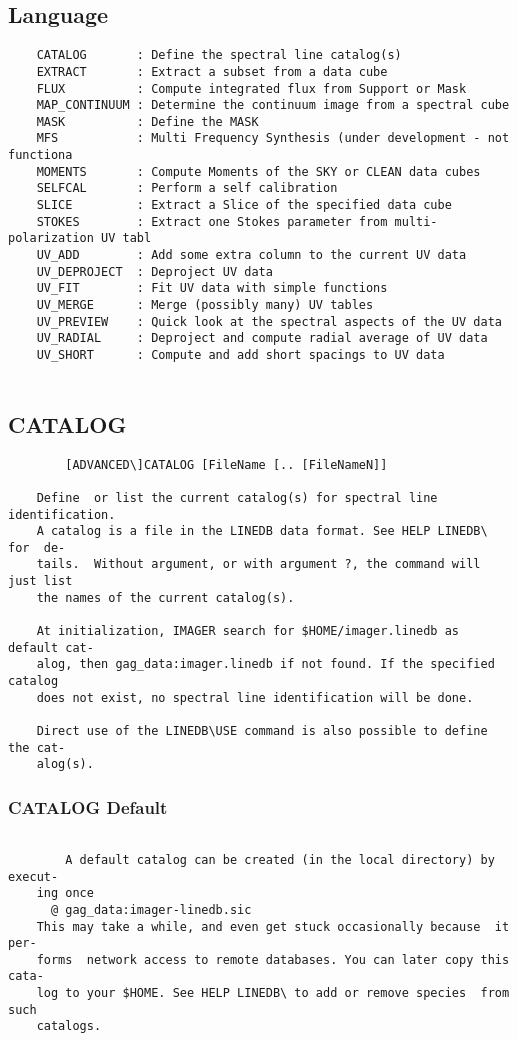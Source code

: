 \subsection{Language}
\begin{verbatim}
    CATALOG       : Define the spectral line catalog(s)
    EXTRACT       : Extract a subset from a data cube
    FLUX          : Compute integrated flux from Support or Mask
    MAP_CONTINUUM : Determine the continuum image from a spectral cube
    MASK          : Define the MASK
    MFS           : Multi Frequency Synthesis (under development - not functiona
    MOMENTS       : Compute Moments of the SKY or CLEAN data cubes
    SELFCAL       : Perform a self calibration
    SLICE         : Extract a Slice of the specified data cube
    STOKES        : Extract one Stokes parameter from multi-polarization UV tabl
    UV_ADD        : Add some extra column to the current UV data
    UV_DEPROJECT  : Deproject UV data
    UV_FIT        : Fit UV data with simple functions
    UV_MERGE      : Merge (possibly many) UV tables
    UV_PREVIEW    : Quick look at the spectral aspects of the UV data
    UV_RADIAL     : Deproject and compute radial average of UV data
    UV_SHORT      : Compute and add short spacings to UV data


\end{verbatim}
\subsection{CATALOG}
\begin{verbatim}
        [ADVANCED\]CATALOG [FileName [.. [FileNameN]]

    Define  or list the current catalog(s) for spectral line identification.
    A catalog is a file in the LINEDB data format. See HELP LINEDB\ for  de-
    tails.  Without argument, or with argument ?, the command will just list
    the names of the current catalog(s).

    At initialization, IMAGER search for $HOME/imager.linedb as default cat-
    alog, then gag_data:imager.linedb if not found. If the specified catalog
    does not exist, no spectral line identification will be done.

    Direct use of the LINEDB\USE command is also possible to define the cat-
    alog(s).

\end{verbatim}
\subsubsection{CATALOG Default}
\begin{verbatim}

        A default catalog can be created (in the local directory) by execut-
    ing once
      @ gag_data:imager-linedb.sic
    This may take a while, and even get stuck occasionally because  it  per-
    forms  network access to remote databases. You can later copy this cata-
    log to your $HOME. See HELP LINEDB\ to add or remove species  from  such
    catalogs.

\end{verbatim}
